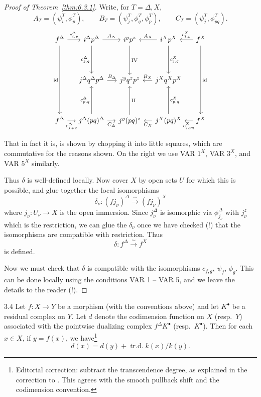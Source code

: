 \begin{proof}[Proof of Theorem~\ref{thm:6.3.1}]
Write, for $T=\Delta,X$,
\[
A_T=(\psi_i^T,\phi_p^T),\qquad
B_T=(\psi_j^T,\phi_q^T,\phi_p^T),\qquad
C_T=(\psi_j^T,\phi_{pq}^T).
\]
\[
\begin{tikzcd}[column sep=1.2em,row sep=4em]
f^\Delta \ar[r,"c^\Delta_{i,p}"] \ar[dd,"\id"'] &
i^\Delta p^\Delta \ar[r,"{A_{\Delta}}"] \ar[d,"c^\Delta_{j,q}"'] &
i^y p^z \ar[d,"\mathrm{IV}"] &
i^X p^X \ar[l,"{A_{X}}"'] \ar[d,"c^X_{j,q}"] &
f^X \ar[l,"c^X_{i,p}"'] \ar[dd,"\id"] \\
& j^\Delta q^\Delta p^\Delta \ar[r,"{B_{\Delta}}"] &
j^y q^z p^z &
j^X q^X p^X \ar[l,"{B_{X}}"'] & \\
f^\Delta \ar[r,"c^\Delta_{j,pq}"'] &
j^\Delta(pq)^\Delta \ar[u,"c^\Delta_{p,q}"] \ar[r,"{C_{\Delta}}"'] &
j^y(pq)^z \ar[u,"\mathrm{II}"'] &
j^X(pq)^X \ar[u,"c^X_{p,q}"'] \ar[l,"{C_{X}}"] &
f^X \ar[l,"c^X_{j,pq}"]
\end{tikzcd}
\]

That in fact it is, is shown by chopping it into little squares, which are commutative for the reasons shown. On the right we use VAR $1^{X}$, VAR $3^{X}$, and VAR $5^{X}$ similarly.

Thus $\delta$ is well-defined locally. Now cover $X$ by open sets $U$ for which this is possible, and glue together the local isomorphisms
\[
\delta_{\nu}\colon (f j_{\nu})^{\Delta} \xrightarrow{\sim} (f j_{\nu})^{X}
\]
where $j_{\nu}\colon U_{\nu}\to X$ is the open immersion. Since $j_{\nu}^{\Delta}$ is isomorphic via $\phi_{j_{\nu}}^{\Delta}$ with $j_{\nu}^{z}$ which is the restriction, we can glue the $\delta_{\nu}$ once we have checked (!) that the isomorphisms are compatible with restriction. Thus
\[
\delta\colon f^{\Delta} \xrightarrow{\sim} f^{X}
\]
is defined.

Now we must check that $\delta$ is compatible with the isomorphisms $c_{f,g}$, $\psi_f$, $\phi_g$. This can be done locally using the conditions VAR 1 -- VAR 5, and we leave the details to the reader (!).
\end{proof}

\begin{samepage}
\begin{bookproposition}{3.4}\label{prop:6.3.4}
Let $f\colon X\to Y$ be a morphism (with the conventions above) and let $K^\bullet$ be a residual complex on $Y$. Let $d$ denote the codimension function on $X$ (resp.\ $Y$) associated with the pointwise dualizing complex $f^{\Delta}K^\bullet$ (resp.\ $K^\bullet$). Then for each $x\in X$, if $y=f(x)$, we have\footnote{Editorial correction: subtract the transcendence degree, as explained in the correction to . This agrees with the smooth pullback shift and the codimension convention.}
\[
d(x) = d(y) + \operatorname{tr.d.} k(x)/k(y).
\]
\end{bookproposition}
\end{samepage}

